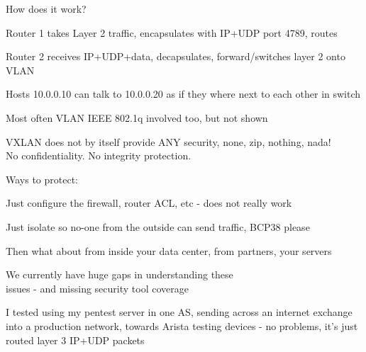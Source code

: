 \documentclass[Screen16to9,17pt]{foils}
\begin{document}

How does it work?

\begin{list2}
\item Router 1 takes Layer 2 traffic, encapsulates with IP+UDP port 4789, routes
\item Router 2 receives IP+UDP+data, decapsulates, forward/switches layer 2 onto VLAN
\item Hosts 10.0.0.10 can talk to 10.0.0.20 as if they where next to each other in switch
\item Most often VLAN IEEE 802.1q involved too, but not shown
\end{list2}



VXLAN does not by itself provide ANY security,
none, zip, nothing, nada! \\
No confidentiality. No integrity protection.

\vskip 5mm

Ways to protect:
\begin{list2}
\item Just configure the firewall, router ACL, etc - does not really work
\item Just isolate so no-one from the outside can send traffic, BCP38 please
\item Then what about from inside your data center, from partners, your servers
\end{list2}

\vskip 1cm
{\Large We currently have huge gaps in understanding these\\
issues - and missing security tool coverage}




I tested using my pentest server in one AS, sending across an internet exchange into a production network, towards Arista testing devices - no problems, it's just routed layer 3 IP+UDP packets

\end{document}
